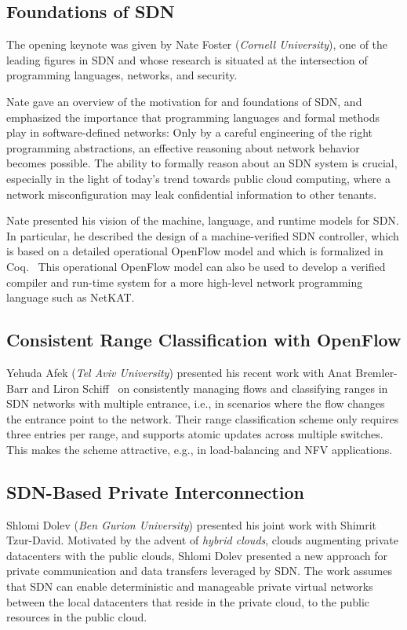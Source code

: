 \documentclass[11pt,pdftex,letter]{article}
\begin{document}
\subsection{Foundations of SDN}

The opening keynote was given by Nate Foster (\emph{Cornell University}),
one of the leading figures in SDN and whose research
is situated at the intersection of programming languages, networks, and security.

Nate gave an overview of the motivation for and foundations of SDN, and
emphasized the importance that programming languages and formal methods
play in software-defined networks: Only by a careful engineering of the right programming abstractions,
an effective reasoning about network behavior becomes possible. The ability to
formally reason about an SDN system is crucial, especially in the light
of today's trend towards public cloud computing, where a network misconfiguration may
leak confidential information to other tenants.

Nate presented his vision of the machine, language, and runtime models for SDN.
In particular, he described the design of a machine-verified SDN controller,
which is based on a detailed operational OpenFlow model
and which is formalized in Coq.~\cite{machine-verified}
This operational OpenFlow model can also be used
to develop a verified compiler and run-time system
for a more high-level network programming language such as NetKAT.~\cite{netkat}


\subsection{Consistent Range Classification with OpenFlow}

Yehuda Afek ({\em Tel Aviv University}) presented his recent work with Anat Bremler-Barr and
Liron Schiff~\cite{AfekBS14} on consistently managing flows and classifying ranges
in SDN networks with multiple entrance, i.e., in scenarios where the flow changes the entrance point
to the network.
Their range classification scheme only requires three entries per range,
and supports atomic updates across multiple switches. This makes the scheme attractive,
e.g., in load-balancing and NFV applications.


\subsection{SDN-Based Private Interconnection}

Shlomi Dolev (\emph{Ben Gurion University}) presented his joint work with Shimrit Tzur-David.
Motivated by the advent of \emph{hybrid clouds}, clouds augmenting
private datacenters with the public clouds, Shlomi Dolev
presented a new approach for private communication and data transfers
leveraged by SDN. The work assumes that SDN can enable deterministic and manageable private virtual
networks between the local datacenters that reside in the private cloud, to the public resources in the public cloud.
\end{document}
